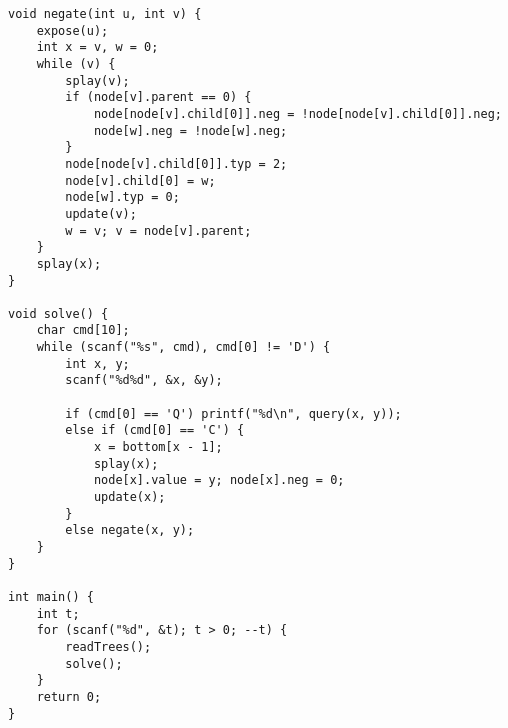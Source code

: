 \begin{verbatim}
void negate(int u, int v) {
    expose(u);
    int x = v, w = 0;
    while (v) {
        splay(v);
        if (node[v].parent == 0) {
            node[node[v].child[0]].neg = !node[node[v].child[0]].neg;
            node[w].neg = !node[w].neg;
        }
        node[node[v].child[0]].typ = 2;
        node[v].child[0] = w;
        node[w].typ = 0;
        update(v);
        w = v; v = node[v].parent;
    }
    splay(x);
}

void solve() {
    char cmd[10];
    while (scanf("%s", cmd), cmd[0] != 'D') {
        int x, y;
        scanf("%d%d", &x, &y);
        
        if (cmd[0] == 'Q') printf("%d\n", query(x, y));
        else if (cmd[0] == 'C') {
            x = bottom[x - 1];
            splay(x);
            node[x].value = y; node[x].neg = 0;
            update(x);
        }
        else negate(x, y);
    }
}

int main() {
    int t;
    for (scanf("%d", &t); t > 0; --t) {
        readTrees();
        solve();
    }
    return 0;
}
\end{verbatim}
